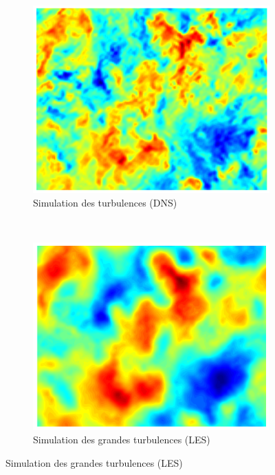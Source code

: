 \begin{figure}[ht]
  \centering
  \begin{subfigure}[b]{0.5\textwidth}
    \centering
    \includegraphics[scale=0.35]{figures/DNS_Velocity_Field.png}
    \caption{\label{fig:dns} Simulation des turbulences (DNS)}
  \end{subfigure}%
  ~
  \begin{subfigure}[b]{0.5\textwidth}
    \centering
    \includegraphics[scale=0.35]{figures/DNS_Filtered_Velocity_Field_Large.png}
    \caption{\label{fig:les} Simulation des grandes turbulences (LES)}
  \end{subfigure}
\end{figure}

